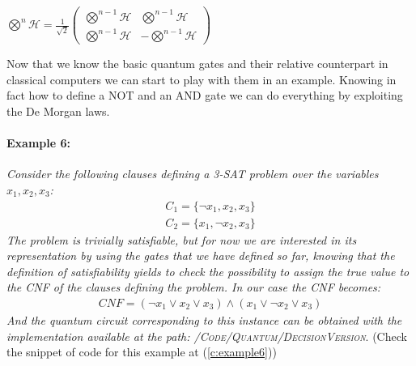 \documentclass[english]{article}
\begin{document}
\begin{itemize}
				\begin{center}
					\centering
					$
					\bigotimes^{n}\mathcal{H} = \frac{1}{\sqrt{2}}
					\begin{pmatrix}
						\bigotimes^{n-1}\mathcal{H} & \bigotimes^{n-1}\mathcal{H} \\
						\bigotimes^{n-1}\mathcal{H} & -\bigotimes^{n-1}\mathcal{H}
					\end{pmatrix}
					$
				\end{center}
			\end{itemize}
			
			Now that we know the basic quantum gates and their relative counterpart in classical computers we can start to play with them in an example. Knowing in fact how to define a NOT and an AND gate we can do everything by exploiting the De Morgan laws.
			
			\paragraph{Example 6:} \label{ex:c6} \emph{Consider the following clauses defining a 3-SAT problem over the variables $x_1, x_2, x_3$:}
			\begin{align*}
				C_1 = \{\neg x_1, x_2, x_3\} \\
				C_2 = \{x_1, \neg x_2, x_3\}
			\end{align*}
			\emph{The problem is trivially satisfiable, but for now we are interested in its representation by using the gates that we have defined so far, knowing that the definition of satisfiability yields to check the possibility to assign the true value to the CNF of the clauses defining the problem. In our case the CNF becomes:}
			\begin{align*}
				CNF = (\neg x_1 \lor x_2 \lor x_3) \land (x_1 \lor \neg x_2 \lor x_3)
			\end{align*}
			\emph{And the quantum circuit corresponding to this instance can be obtained with the implementation available at the path: \textsc{/Code/Quantum/DecisionVersion}}. (Check the snippet of code for this example at (\ref{c:example6}))		
			
\end{document}
